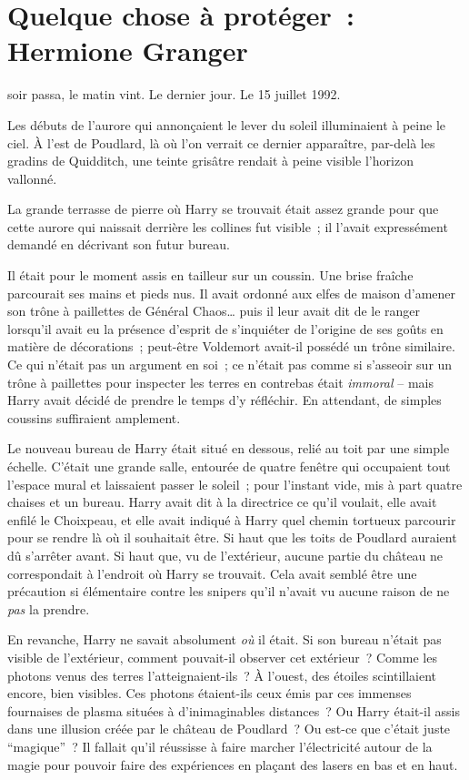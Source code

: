 \chapter{Quelque chose à protéger~: Hermione Granger}

 soir passa, le matin vint. Le dernier jour. Le 15 juillet 1992.

\hplettrineextrapara
Les débuts de l'aurore qui annonçaient le lever du soleil illuminaient à peine le ciel. À l'est de Poudlard, là où l'on verrait ce dernier apparaître, par-delà les gradins de Quidditch, une teinte grisâtre rendait à peine visible l'horizon vallonné.

La grande terrasse de pierre où Harry se trouvait était assez grande pour que cette aurore qui naissait derrière les collines fut visible~; il l'avait expressément demandé en décrivant son futur bureau.

Il était pour le moment assis en tailleur sur un coussin. Une brise fraîche parcourait ses mains et pieds nus. Il avait ordonné aux elfes de maison d'amener son trône à paillettes de Général Chaos… puis il leur avait dit de le ranger lorsqu'il avait eu la présence d'esprit de s'inquiéter de l'origine de ses goûts en matière de décorations~; peut-être Voldemort avait-il possédé un trône similaire. Ce qui n'était pas un argument en soi~; ce n'était pas comme si s'asseoir sur un trône à paillettes pour inspecter les terres en contrebas était \emph{immoral} -- mais Harry avait décidé de prendre le temps d'y réfléchir. En attendant, de simples coussins suffiraient amplement.

Le nouveau bureau de Harry était situé en dessous, relié au toit par une simple échelle. C'était une grande salle, entourée de quatre fenêtre qui occupaient tout l'espace mural et laissaient passer le soleil~; pour l'instant vide, mis à part quatre chaises et un bureau. Harry avait dit à la directrice ce qu'il voulait, elle avait enfilé le Choixpeau, et elle avait indiqué à Harry quel chemin tortueux parcourir pour se rendre là où il souhaitait être. Si haut que les toits de Poudlard auraient dû s'arrêter avant. Si haut que, vu de l'extérieur, aucune partie du château ne correspondait à l'endroit où Harry se trouvait. Cela avait semblé être une précaution si élémentaire contre les snipers qu'il n'avait vu aucune raison de ne \emph{pas} la prendre.

En revanche, Harry ne savait absolument \emph{où} il était. Si son bureau n'était pas visible de l'extérieur, comment pouvait-il observer cet extérieur~? Comme les photons venus des terres l'atteignaient-ils~? À l'ouest, des étoiles scintillaient encore, bien visibles. Ces photons étaient-ils ceux émis par ces immenses fournaises de plasma situées à d'inimaginables distances~? Ou Harry était-il assis dans une illusion créée par le château de Poudlard~? Ou est-ce que c'était juste “magique”~? Il fallait qu'il réussisse à faire marcher l'électricité autour de la magie pour pouvoir faire des expériences en plaçant des lasers en bas et en haut.

